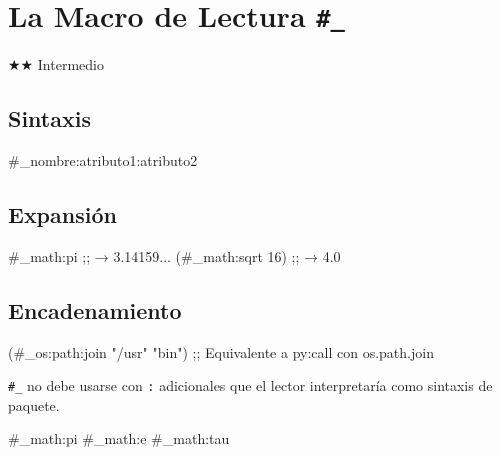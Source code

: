 \chapter{La Macro de Lectura \texttt{\#\_}}
\label{chap:reader-underscore}
{\huge$\bigstar$}{\huge$\bigstar$} Intermedio

\section{Sintaxis}
\begin{lispcode}
\#_nombre:atributo1:atributo2
\end{lispcode}

\section{Expansión}
\begin{lispcode}
\#_math:pi           ;; → 3.14159...
(\#_math:sqrt 16)    ;; → 4.0
\end{lispcode}

\section{Encadenamiento}
\begin{lispcode}
(\#_os:path:join "/usr" "bin")
;; Equivalente a py:call con os.path.join
\end{lispcode}

\begin{warningbox}
\texttt{\#\_} no debe usarse con \texttt{:} adicionales que el lector
interpretaría como sintaxis de paquete.
\end{warningbox}

\begin{examplebox}[title=Constantes matemáticas]
\begin{lispcode}
\#_math:pi  \#_math:e  \#_math:tau
\end{lispcode}
\end{examplebox}

